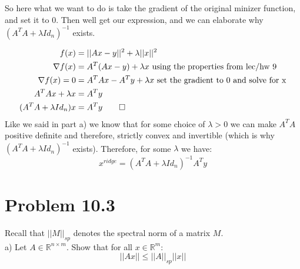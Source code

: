 \documentclass[12pt,twoside]{article}
\newcommand{\R}{\mathbb{R}}
\begin{document}
So here what we want to do is take the gradient of the original minizer function, and set it to 0. Then well get our expression, and we can elaborate why $(A^TA + \lambda Id_n)^{-1}$ exists. 

\begin{equation}
    \begin{split}
        f(x) &= ||Ax-y||^2 + \lambda ||x||^2 \\
        \nabla f(x) &= A^T(Ax -y) +\lambda x  \text{ using the properties from lec/hw 9} \\
        \nabla f(x) = 0 &= A^TAx - A^Ty  + \lambda x \text{ set the gradient to 0 and solve for x} \\
        A^TAx + \lambda x &= A^Ty  \\
        (A^TA+\lambda Id_n)x &= A^Ty \qed
    \end{split}    
\end{equation}
Like we said in part a) we know that for some choice of $\lambda >0$ we can make $A^TA$ positive definite and therefore, strictly convex and invertible (which is why $(A^TA + \lambda Id_n)^{-1}$ exists).  Therefore, for some $\lambda$ we have: 
$$
x^{ridge} = (A^TA + \lambda Id_n)^{-1}A^Ty
$$
 \newpage 
\section{Problem 10.3}
Recall that $||M||_{sp}$ denotes the spectral norm of a matrix $M$. \\
a) Let $A \in \R^{n\times m}$. Show that for all $x \in \R^m$:
$$
    ||Ax|| \leq ||A||_{sp}||x|| 
$$ \\
\end{document}
